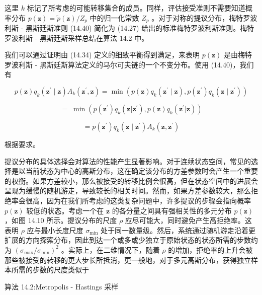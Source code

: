 \documentclass[10pt]{report}
\begin{document}
这里 \(k\) 标记了所考虑的可能转移集合的成员。同样，评估接受准则不需要知道概率分布 \(p\left( \mathbf{z}\right)  = \widetilde{p}\left( \mathbf{z}\right) /{Z}_{p}\) 中的归一化常数 \({Z}_{p}\) 。对于对称的提议分布，梅特罗波利斯 - 黑斯廷斯准则 (14.40) 简化为 (14.27) 给出的标准梅特罗波利斯准则。梅特罗波利斯 - 黑斯廷斯采样总结在算法 14.2 中。

我们可以通过证明由 (14.34) 定义的细致平衡得到满足，来表明 \(p\left( \mathbf{z}\right)\) 是由梅特罗波利斯 - 黑斯廷斯算法定义的马尔可夫链的一个不变分布。使用 (14.40)，我们有

\[
p\left( \mathbf{z}\right) {q}_{k}\left( {{\mathbf{z}}^{\prime } \mid  \mathbf{z}}\right) {A}_{k}\left( {{\mathbf{z}}^{\prime },\mathbf{z}}\right)  = \min \left( {p\left( \mathbf{z}\right) {q}_{k}\left( {{\mathbf{z}}^{\prime } \mid  \mathbf{z}}\right) ,p\left( {\mathbf{z}}^{\prime }\right) {q}_{k}\left( {\mathbf{z} \mid  {\mathbf{z}}^{\prime }}\right) }\right)
\]

\[
= \;\min \left( {p\left( {\mathbf{z}}^{\prime }\right) {q}_{k}\left( {\mathbf{z}|{\mathbf{z}}^{\prime }}\right) ,p\left( \mathbf{z}\right) {q}_{k}\left( {{\mathbf{z}}^{\prime }|\mathbf{z}}\right) }\right)
\]

\[
= p\left( {\mathbf{z}}^{\prime }\right) {q}_{k}\left( {\mathbf{z} \mid  {\mathbf{z}}^{\prime }}\right) {A}_{k}\left( {\mathbf{z},{\mathbf{z}}^{\prime }}\right)  \tag{14.41}
\]

根据要求。

提议分布的具体选择会对算法的性能产生显著影响。对于连续状态空间，常见的选择是以当前状态为中心的高斯分布，这在确定该分布的方差参数时会产生一个重要的权衡。如果方差较小，那么被接受的转移比例会很高，但在状态空间中的进展会呈现为缓慢的随机游走，导致较长的相关时间。然而，如果方差参数较大，那么拒绝率会很高，因为在我们所考虑的这类复杂问题中，许多提议的步骤会指向概率 \(p\left( \mathbf{z}\right)\) 较低的状态。考虑一个在 \(\mathbf{z}\) 的各分量之间具有强相关性的多元分布 \(p\left( \mathbf{z}\right)\) ，如图 14.10 所示。提议分布的尺度 \(\rho\) 应尽可能大，同时避免产生高拒绝率。这表明 \(\rho\) 应与最小长度尺度 \({\sigma }_{\min }\) 处于同一数量级。然后，系统通过随机游走沿着更扩展的方向探索分布，因此到达一个或多或少独立于原始状态的状态所需的步数约为 \({\left( {\sigma }_{\max }/{\sigma }_{\min }\right) }^{2}\) 。实际上，在二维情况下，随着 \(\rho\) 的增加，拒绝率的上升会被那些被接受的转移的更大步长所抵消，更一般地，对于多元高斯分布，获得独立样本所需的步数的尺度类似于

算法 14.2:Metropolis - Hastings 采样
\end{document}
